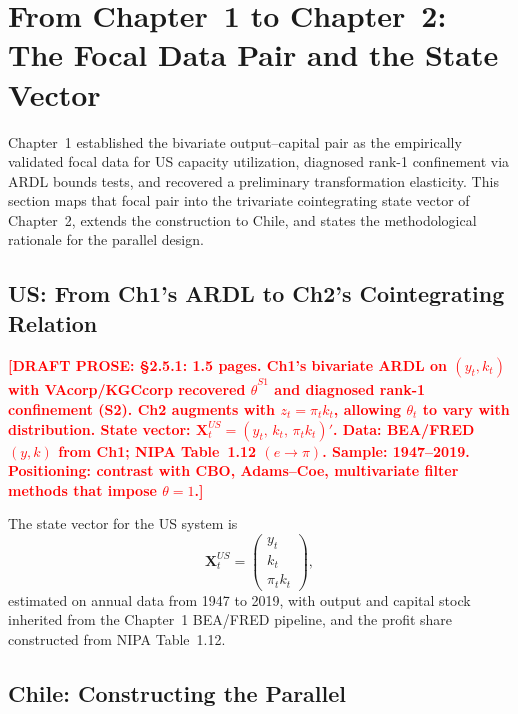 \documentclass[12pt,letterpaper]{article}
\newcommand{\pit}{\pi_t}           %
\newcommand{\draftnote}[1]{%
  \textcolor{red}{\textbf{[DRAFT PROSE: #1]}}}
\begin{document}
\section{From Chapter~1 to Chapter~2: The Focal Data Pair
  and the State Vector}
\label{sec:bridge}

Chapter~1 established the bivariate output--capital pair as the empirically
validated focal data for US capacity utilization, diagnosed rank-1 confinement
via ARDL bounds tests, and recovered a preliminary transformation elasticity.
This section maps that focal pair into the trivariate cointegrating state
vector of Chapter~2, extends the construction to Chile, and states the
methodological rationale for the parallel design.


\subsection{US: From Ch1's ARDL to Ch2's Cointegrating Relation}
\label{sec:bridge_us}

\draftnote{§2.5.1: 1.5 pages. Ch1's bivariate ARDL on $(y_t, k_t)$ with
  VAcorp/KGCcorp recovered $\hat{\theta}^{S1}$ and diagnosed rank-1
  confinement (S2). Ch2 augments with $z_t = \pit k_t$, allowing $\theta_t$
  to vary with distribution. State vector:
  $\mathbf{X}_t^{US} = (y_t,\, k_t,\, \pit k_t)'$.
  Data: BEA/FRED $(y,k)$ from Ch1; NIPA Table~1.12 $(e \to \pi)$.
  Sample: 1947--2019. Positioning: contrast with CBO, Adams--Coe,
  multivariate filter methods that impose $\theta=1$.}

The state vector for the US system is
\begin{equation}
  \mathbf{X}_t^{US} = \begin{pmatrix} y_t \\ k_t \\ \pit k_t \end{pmatrix},
  \label{eq:statevec_us}
\end{equation}
estimated on annual data from 1947 to 2019, with output and capital stock
inherited from the Chapter~1 BEA/FRED pipeline, and the profit share
constructed from NIPA Table~1.12.


\subsection{Chile: Constructing the Parallel}
\label{sec:bridge_chile}
\end{document}
